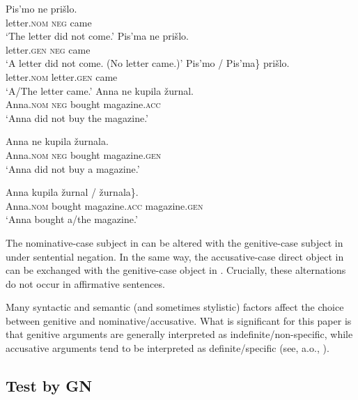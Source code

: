 \documentclass[output=paper]{langscibook}
\begin{document}
\ea\label{GN-S}
\ea\label{GN-SN}
\gll	Pis'mo ne prišlo.\\
	letter.\textsc{nom} \textsc{neg} came\\
\glt	`The letter did not come.'
\ex\label{GN-SG}
\gll	Pis'ma ne prišlo.\\
	letter.\textsc{gen} \textsc{neg} came\\
\glt	`A letter did not come. (No letter came.)'
\hfill \citep[292]{Apresjan1985}
\ex\label{GN-Saf}
\gll	\minsp{\{} Pis'mo / \minsp{*} Pis'ma\} prišlo.\\
	{} letter.\textsc{nom} {} {} letter.\textsc{gen} came\\
\glt	`A/The letter came.'
\z\ex\label{GN-O}
\ea\label{GN-OA}
\gll	Anna ne kupila žurnal.\\
	Anna.\textsc{nom} \textsc{neg} bought magazine.\textsc{acc}\\
\glt `Anna did not buy the magazine.'

\ex\label{GN-OG}
\gll	Anna ne kupila žurnala.\\
	Anna.\textsc{nom} \textsc{neg} bought magazine.\textsc{gen}\\
\glt	`Anna did not buy a magazine.'

\ex\label{GN-Oaf}
\gll	Anna kupila \minsp{\{} žurnal / \minsp{*} žurnala\}.\\
	Anna.\textsc{nom} bought {} magazine.\textsc{acc} {} {} magazine.\textsc{gen}\\
\glt	`Anna bought a/the magazine.'
\hfill \citep[647]{Harves2002}
\z\z

\noindent The nominative-case subject in  can be altered with the genitive-case subject in  under sentential negation. In the same way, the accusative-case direct object in  can be exchanged with the genitive-case object in . Crucially, these alternations do not occur in affirmative sentences.\largerpage

Many syntactic and semantic (and sometimes stylistic) factors affect the choice between genitive and nominative/accusative. What is significant for this paper is that genitive arguments are generally interpreted as indefinite/non-specific, while accusative arguments tend to be interpreted as definite/specific (see, a.o., \citealt{Timberlake1975,Harves2002,Kim2003,Partee.Borschev2004,Kagan2012,Harves2013}).

\subsection{Test by GN}
\end{document}

